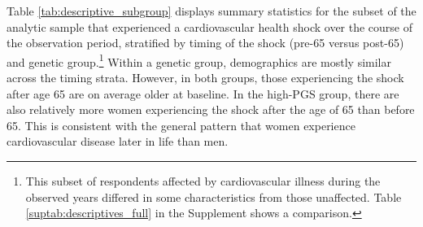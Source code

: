 \documentclass[12pt]{article}
\begin{document}
Table \ref{tab:descriptive_subgroup} displays summary statistics for the subset of the analytic sample that experienced a cardiovascular health shock over the course of the observation period, stratified by timing of the shock (pre-65 versus post-65) and genetic group.\footnote{
This subset of respondents affected by cardiovascular illness during the observed years differed in some characteristics from those unaffected. Table \ref{suptab:descriptives_full} in the Supplement shows a comparison.
}%
Within a genetic group, demographics are mostly similar across the timing strata. However, in both groups, those experiencing the shock after age 65 are on average older at baseline. In the high-PGS group, there are also relatively more women experiencing the shock after the age of 65 than before 65. This is consistent with the general pattern that women experience cardiovascular disease later in life than men.\cite{Lloyd-Jones2010}


%
%
\end{document}

